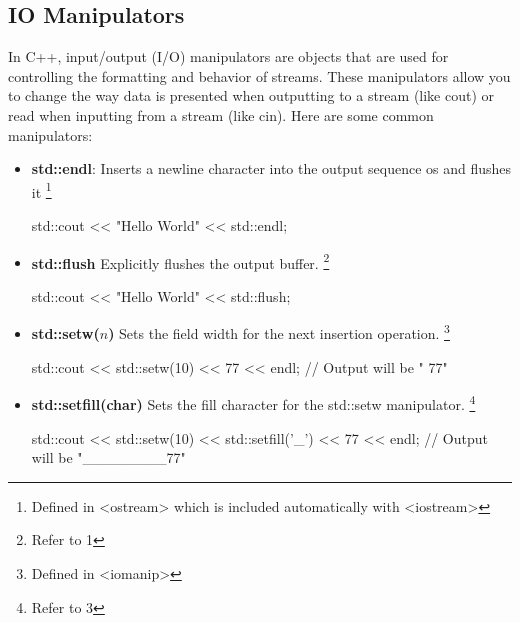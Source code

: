 \documentclass{report}
\begin{document}
    \pagebreak
    \subsection{IO Manipulators}
    \bigbreak \noindent 
    In C++, input/output (I/O) manipulators are objects that are used for controlling the formatting and behavior of streams. These manipulators allow you to change the way data is presented when outputting to a stream (like cout) or read when inputting from a stream (like cin).
    \bigbreak \noindent 
    Here are some common manipulators:
    \begin{itemize}
        \item \textbf{std::endl}:  Inserts a newline character into the output sequence os and flushes it \footnote{Defined in <ostream> which is included automatically with <iostream>}
            \smallbreak
            
            \begin{cppcode}
            std::cout << "Hello World" << std::endl;
            \end{cppcode}
            
        \item \textbf{std::flush}  Explicitly flushes the output buffer. \footnote{Refer to 1}
            \smallbreak
            
            \begin{cppcode}
            std::cout << "Hello World" << std::flush;
            \end{cppcode}
            
        \item \textbf{std::setw($n$)} Sets the field width for the next insertion operation. \footnote{Defined in <iomanip>}
            \smallbreak
            
            \begin{cppcode}
            std::cout << std::setw(10) << 77 << endl; 
            // Output will be "        77"
            \end{cppcode}
            
        \item \textbf{std::setfill(char)} Sets the fill character for the std::setw manipulator. \footnote{Refer to 3}
            \smallbreak
            
            \begin{cppcode}
            std::cout << std::setw(10) << std::setfill('_') << 77 << endl; 
            // Output will be "________77"
            \end{cppcode}
            


\end{itemize}
\end{document}
